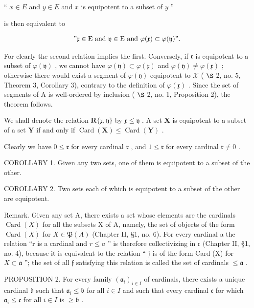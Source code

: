 `` \(x \in E\) and \(y \in E\) and \(x\) is equipotent to a subset of \(y\) ''

is then equivalent to

\[
" \mathfrak {x} \in \mathrm{E} \text {   and   } \mathfrak {y} \in \mathrm{E} \text {   and   } \varphi (\mathfrak {x}) \subset \varphi (\mathfrak {y})".
\]

For clearly the second relation implies the first. Conversely, if \(\mathfrak{r}\) is equipotent to a subset of \(\varphi(\mathfrak{y})\) , we cannot have \(\varphi(\mathfrak{y}) \subset \varphi(\mathfrak{x})\) and \(\varphi(\mathfrak{y}) \neq \varphi(\mathfrak{x})\) ; otherwise there would exist a segment of \(\varphi(\mathfrak{y})\) equipotent to \(\mathcal{X}\) ( \(\S\) 2, no. 5, Theorem 3, Corollary 3), contrary to the definition of \(\varphi(\mathfrak{x})\) . Since the set of segments of A is well-ordered by inclusion ( \(\S\) 2, no. 1, Proposition 2), the theorem follows.

We shall denote the relation \(\mathbf{R}\{\mathfrak{x},\mathfrak{y}\}\) by \(\mathfrak{x}\leqslant \mathfrak{y}\) . A set \(\mathbf{X}\) is equipotent to a subset of a set \(\mathbf{Y}\) if and only if \(\operatorname{Card}(\mathbf{X})\leqslant \operatorname{Card}(\mathbf{Y})\) .

Clearly we have \(0 \leqslant \mathfrak{r}\) for every cardinal \(\mathfrak{r}\) , and \(1 \leqslant \mathfrak{r}\) for every cardinal \(\mathfrak{r} \neq 0\) .

COROLLARY 1. Given any two sets, one of them is equipotent to a subset of the other.

COROLLARY 2. Two sets each of which is equipotent to a subset of the other are equipotent.

Remark. Given any set A, there exists a set whose elements are the cardinals \(\operatorname{Card}(X)\) for all the subsets X of A, namely, the set of objects of the form \(\operatorname{Card}(X)\) for \(X \in \mathfrak{P}(A)\) (Chapter II, §1, no. 6). For every cardinal a the relation ``r is a cardinal and \(r \leqslant a\) '' is therefore collectivizing in r (Chapter II, §1, no. 4), because it is equivalent to the relation `` \(\mathfrak{f}\) is of the form Card (X) for \(X \subset \mathfrak{a}\) ''; the set of all \(\mathfrak{f}\) satisfying this relation is called the set of cardinals \(\leqslant \mathfrak{a}\) .

PROPOSITION 2. For every family \((\mathfrak{a}_i)_{i\in I}\) of cardinals, there exists a unique cardinal \(\mathfrak{b}\) such that \(\mathfrak{a}_i\leqslant \mathfrak{b}\) for all \(i\in I\) and such that every cardinal \(\mathfrak{c}\) for which \(\mathfrak{a}_i\leqslant \mathfrak{c}\) for all \(i\in I\) is \(\geqslant \mathfrak{b}\) .

